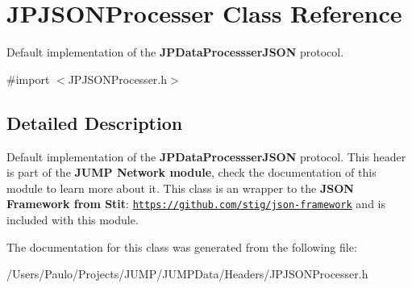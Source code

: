 \hypertarget{interface_j_p_j_s_o_n_processer}{
\section{JPJSONProcesser Class Reference}
\label{interface_j_p_j_s_o_n_processer}
}


Default implementation of the {\bfseries JPDataProcessserJSON} protocol.  




{\ttfamily \#import $<$JPJSONProcesser.h$>$}



\subsection{Detailed Description}
Default implementation of the {\bfseries JPDataProcessserJSON} protocol. This header is part of the {\bfseries JUMP Network module}, check the documentation of this module to learn more about it. This class is an wrapper to the {\bfseries JSON Framework from Stit}: \href{https://github.com/stig/json-framework}{\tt https://github.com/stig/json-\/framework} and is included with this module. 

The documentation for this class was generated from the following file:\begin{DoxyCompactItemize}
\item 
/Users/Paulo/Projects/JUMP/JUMPData/Headers/JPJSONProcesser.h\end{DoxyCompactItemize}
